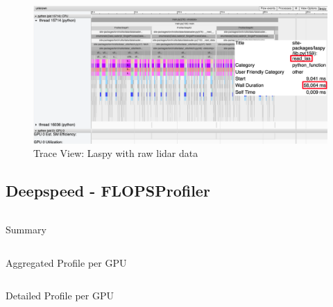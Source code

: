 \documentclass[12pt, a4paper, hidelinks]{article}
\begin{document}
\begin{figure}[H]
\centering
\includegraphics[width=1\textwidth]{./assets/scap_gtx1080_profiler-torch_sample-points_14650750_trace-view-laspy}
\caption*{Trace View: Laspy with raw lidar data}
\label{fig:scap_gtx1080_profiler-torch_sample-points_14650750_trace-view-laspy}
\end{figure}



\subsection{Deepspeed - FLOPSProfiler}
\label{sec:r-FLOPSprofiler}


\begin{listing}[H]
\inputminted[xleftmargin=1em,linenos,fontsize=\scriptsize, firstline=1,lastline=16]{python}{./assets/scap_gtx1080_deepspeed_14615344_4294967294_one-epoch.txt}
\caption{Summary}
\label{lst:scap_gtx1080_deepspeed_14615344_4294967294_one-epoch-summary}
\end{listing}

\begin{listing}[H]
\inputminted[xleftmargin=1em,linenos,fontsize=\scriptsize, firstline=18,lastline=31]{python}{./assets/scap_gtx1080_deepspeed_14615344_4294967294_one-epoch.txt}
\caption{Aggregated Profile per GPU}
\label{lst:scap_gtx1080_deepspeed_14615344_4294967294_one-epoch-aggregated}
\end{listing}

\begin{listing}[H]
\inputminted[xleftmargin=1em,linenos,fontsize=\tiny, firstline=33,lastline=48, breaklines]{python}{./assets/scap_gtx1080_deepspeed_14615344_4294967294_one-epoch.txt}
\caption{Detailed Profile per GPU}
\label{lst:scap_gtx1080_deepspeed_14615344_4294967294_one-epoch-detailed}
\end{listing}


\end{document}
